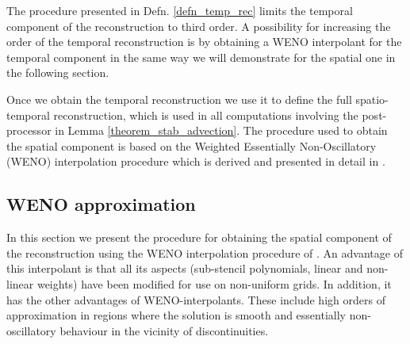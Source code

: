 \documentclass[final]{amsart}
\numberwithin{equation}{section}
\begin{document}
\begin{Rem} The procedure presented in Defn. \ref{defn_temp_rec} limits the temporal component of the reconstruction to third order.  A possibility for increasing the order of the temporal reconstruction is by obtaining a WENO interpolant for the temporal component in the same way we will demonstrate for the spatial one in the following section.
\end{Rem}

Once we obtain the temporal reconstruction we use it to define the
full spatio-temporal reconstruction, which is used in all computations
involving the post-processor in Lemma \ref{theorem_stab_advection}.
The procedure used to obtain the spatial component is based on the
Weighted Essentially Non-Oscillatory (WENO) interpolation procedure
which is derived and presented in detail in \cite{janett2019novel}.

\subsection{WENO approximation}  In this section we present the procedure for obtaining the spatial component of the reconstruction using the WENO interpolation procedure of \cite{janett2019novel}. An advantage of this interpolant is that all its aspects (sub-stencil polynomials, linear and non-linear weights) have been modified for use on non-uniform grids.  In addition, it has the other advantages of WENO-interpolants.  These include high orders of approximation in regions where the solution is smooth and essentially non-oscillatory behaviour in the vicinity of discontinuities.  
\end{document}
